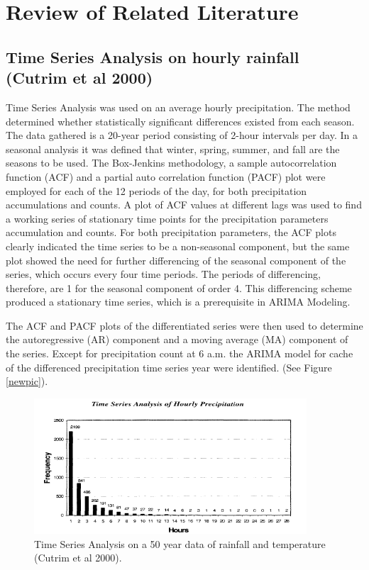 \chapter{Review of Related Literature}

\section*{Time Series Analysis on hourly rainfall (Cutrim et al 2000)}

Time Series Analysis was used on an average hourly precipitation. The method determined whether statistically significant differences existed from each season. The data gathered is a 20-year period consisting of 2-hour intervals per day. In a seasonal analysis it was defined that winter, spring, summer, and fall are the seasons to be used. The Box-Jenkins methodology, a sample autocorrelation function (ACF) and a partial auto correlation function (PACF) plot were employed for each of the 12 periods of the day, for both precipitation accumulations and counts. A plot of ACF values at different lags was used to find a working series of stationary time points for the precipitation parameters accumulation and counts. For both precipitation parameters, the ACF plots clearly indicated the time series to be a non-seasonal component, but the same plot showed the need for further differencing of the seasonal component of the series, which occurs every four time periods. The periods of differencing, therefore, are 1 for the seasonal component of order 4. This differencing scheme produced a stationary time series, which is a prerequisite in ARIMA Modeling. 

The ACF and PACF plots of the differentiated series were then used to determine the autoregressive (AR) component and a moving average (MA) component of the series. Except for precipitation count at 6 a.m. the ARIMA model for cache of the differenced precipitation time series year were identified. (See Figure \eqref{newpic}).

\begin{figure}[!ht]
\centering
\includegraphics[width=4in, keepaspectratio]{daily}
\caption{\label{newpic} Time Series Analysis on a 50 year data of rainfall and temperature (Cutrim et al 2000).}
\end{figure}

